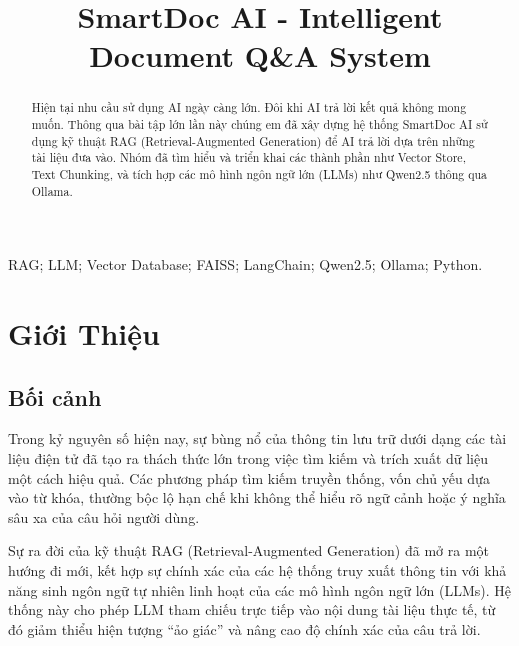 \documentclass[conference]{IEEEtran}
\begin{document}
\title{SmartDoc AI - Intelligent Document Q\&A System}

\author{
}

\maketitle

\begin{abstract}
Hiện tại nhu cầu sử dụng AI ngày càng lớn. Đôi khi AI trả lời kết quả không mong muốn. Thông qua bài tập lớn lần này chúng em đã xây dựng hệ thống SmartDoc AI sử dụng kỹ thuật RAG (Retrieval-Augmented Generation) để AI trả lời dựa trên những tài liệu đưa vào. Nhóm đã tìm hiểu và triển khai các thành phần như Vector Store, Text Chunking, và tích hợp các mô hình ngôn ngữ lớn (LLMs) như Qwen2.5 thông qua Ollama.
\end{abstract}

\begin{IEEEkeywords}
RAG; LLM; Vector Database; FAISS; LangChain; Qwen2.5; Ollama; Python.
\end{IEEEkeywords}

\section{Giới Thiệu}

\subsection{Bối cảnh}

Trong kỷ nguyên số hiện nay, sự bùng nổ của thông tin lưu trữ dưới dạng các tài liệu điện tử đã tạo ra thách thức lớn trong việc tìm kiếm và trích xuất dữ liệu một cách hiệu quả. Các phương pháp tìm kiếm truyền thống, vốn chủ yếu dựa vào từ khóa, thường bộc lộ hạn chế khi không thể hiểu rõ ngữ cảnh hoặc ý nghĩa sâu xa của câu hỏi người dùng.

Sự ra đời của kỹ thuật RAG (Retrieval-Augmented Generation) đã mở ra một hướng đi mới, kết hợp sự chính xác của các hệ thống truy xuất thông tin với khả năng sinh ngôn ngữ tự nhiên linh hoạt của các mô hình ngôn ngữ lớn (LLMs). Hệ thống này cho phép LLM tham chiếu trực tiếp vào nội dung tài liệu thực tế, từ đó giảm thiểu hiện tượng ``ảo giác'' và nâng cao độ chính xác của câu trả lời.
\end{document}
